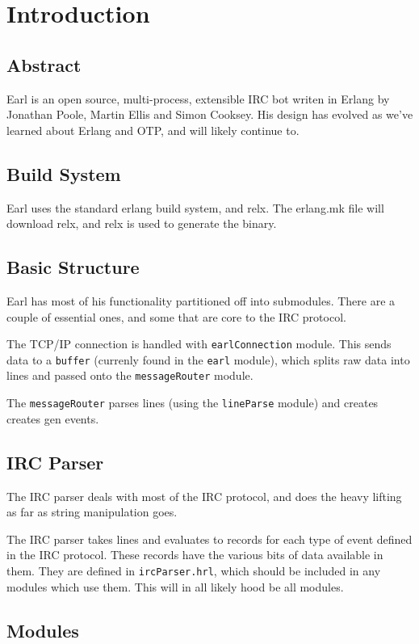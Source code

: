 \documentclass[12pt]{article}
\begin{document}

\section*{Introduction}

\subsection*{Abstract}

Earl is an open source, multi-process, extensible IRC bot writen in Erlang by
Jonathan Poole, Martin Ellis and Simon Cooksey.  His design has evolved as we've
learned about Erlang and OTP, and will likely continue to.

\subsection*{Build System}

Earl uses the standard erlang build system, and relx. The erlang.mk file will
download relx, and relx is used to generate the binary.


\subsection*{Basic Structure}

Earl has most of his functionality partitioned off into submodules. There are a
couple of essential ones, and some that are core to the IRC protocol.

The TCP/IP connection is handled with \texttt{earlConnection} module. This sends
data to a \texttt{buffer} (currenly found in the \texttt{earl} module), which
splits raw data into lines and passed onto the \texttt{messageRouter} module.

The \texttt{messageRouter} parses lines (using the \texttt{lineParse} module)
and creates creates gen events.

\subsection*{IRC Parser}

The IRC parser deals with most of the IRC protocol, and does the heavy lifting
as far as string manipulation goes.

The IRC parser takes lines and evaluates to records for each type of event 
defined in the IRC protocol. These records have the various bits of data 
available in them. They are defined in \texttt{ircParser.hrl}, which should be
included in any modules which use them. This will in all likely hood be all 
modules.

\subsection*{Modules}
\end{document}
